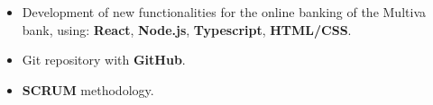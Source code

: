 \documentclass[letterpaper]{style} %
\begin{document}


\divider

\begin{itemize}
	\item Development of new functionalities for the online banking of the Multiva bank, using: \textbf{React}, \textbf{Node.js}, \textbf{Typescript}, \textbf{HTML/CSS}.
	\item Git repository with \textbf{GitHub}.
	\item \textbf{SCRUM} methodology.
\end{itemize}



\end{document}

